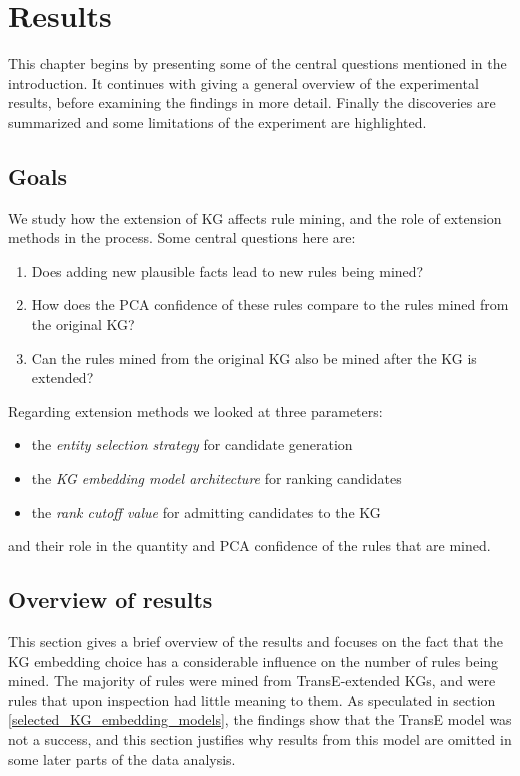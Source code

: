 \chapter{Results}
This chapter begins by presenting some of the central questions mentioned in the introduction. It continues with giving a general overview of the experimental results, before examining the findings in more detail. Finally the discoveries are summarized and some limitations of the experiment are highlighted.

\section{Goals}
We study how the extension of KG affects rule mining, and the role of extension methods in the process. Some central questions here are:
\begin{enumerate}
    \item Does adding new plausible facts lead to new rules being mined? 
    \item How does the PCA confidence of these rules compare to the rules mined from the original KG?
    \item Can the rules mined from the original KG also be mined after the KG is extended?
\end{enumerate}
Regarding extension methods we looked at three parameters:
\begin{itemize}
    \item the \textit{entity selection strategy} for candidate generation
    \item the \textit{KG embedding model architecture} for ranking candidates
    \item the \textit{rank cutoff value} for admitting candidates to the KG
\end{itemize}
and their role in the quantity and PCA confidence of the rules that are mined.

\section{Overview of results}
This section gives a brief overview of the results and focuses on the fact that the KG embedding choice has a considerable influence on the number of rules being mined. The majority of rules were mined from TransE-extended KGs, and were rules that upon inspection had little meaning to them. As speculated in section \ref{selected_KG_embedding_models}, the findings show that the TransE model was not a success, and this section justifies why results from this model are omitted in some later parts of the data analysis.

